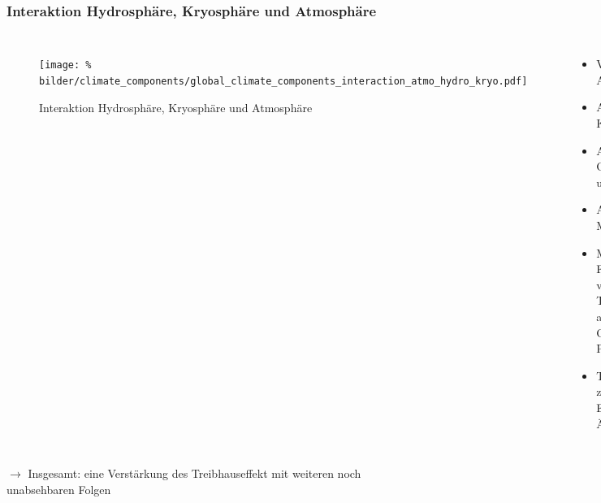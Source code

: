 \begin{frame}
	\frametitle{Interaktion Hydrosphäre, Kryosphäre und Atmosphäre}
	\begin{columns}
		\begin{figure}
			\centering
			\texttt{[image: \%
	        bilder/climate\_components/global\_climate\_components\_interaction\_atmo\_hydro\_kryo.pdf]}
			\caption{Interaktion Hydrosphäre, Kryosphäre und Atmosphäre}
		\end{figure}
		\begin{itemize}
			\item Verringerter Albedo-Effekt
			\item Abgeschwächte Konvektion
			\item Abgeschwächte Ozeanströmung und Winde
			\item Anstieg des Meeresspiegels
			\item Massive Freisetzung von Treibhausgasen aus den Senken Ozean und Permafrost
			\item Trägheit führt zu verzögertem Eintreten der Änderungen
		\end{itemize}
	\end{columns}
	\begin{block}{}
			$\rightarrow$ Insgesamt: eine Verstärkung des Treibhauseffekt mit weiteren noch unabsehbaren Folgen
	\end{block}

\end{frame}
